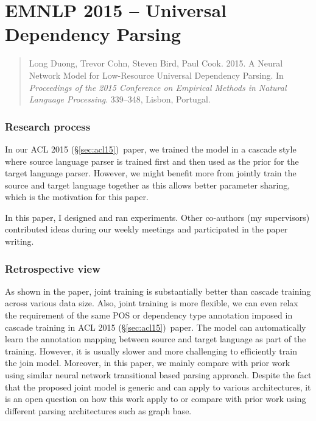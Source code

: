 \documentclass[12pt,twoside,final,hidelinks]{ltthesis}
\theoremstyle{definition}
\newcommand\aclv{ACL 2015 (\S\ref{sec:acl15})}
\begin{document}




\section{EMNLP 2015 -- Universal Dependency Parsing}
\label{sec:emnlp15}
\begin{quote}
Long Duong, Trevor Cohn, Steven Bird, Paul Cook. 2015. A Neural Network Model for Low-Resource Universal Dependency Parsing. In \textit{Proceedings of the 2015 Conference on Empirical Methods in Natural Language Processing}. 339--348, Lisbon, Portugal.
\end{quote}

\subsubsection{Research process}
In our \aclv\ paper, we trained the model in a cascade style where source language parser is trained first and then used as the prior for the target language parser. However, we might benefit more from jointly train the source and target language together as this allows better 
parameter sharing, which is the motivation for this paper. 

In this paper, I designed and ran experiments. Other co-authors (my supervisors) contributed ideas during our weekly 
meetings and participated in the paper writing. 

\subsubsection{Retrospective view}
As shown in the paper, joint training is substantially better than cascade training across various data size. Also, joint training is more flexible, we can 
even relax the requirement of the same POS or dependency type annotation imposed in cascade training in \aclv\ paper. The model can automatically learn the 
annotation mapping between source and target language as part of the training. However, it is usually slower and more challenging to efficiently train the 
join model. Moreover, in this paper, we mainly compare with prior work using similar neural network transitional based parsing approach. Despite the fact that the 
proposed joint model is generic and can apply to various architectures, it is an open question on how this work apply to or compare with prior work using different parsing 
architectures such as graph base. 

\end{document}
